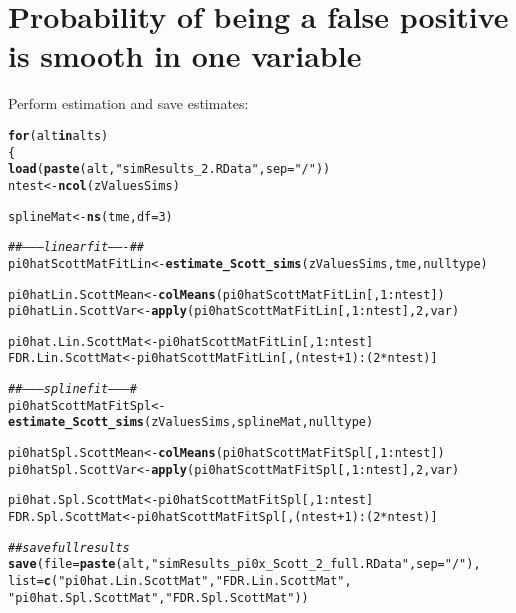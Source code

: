 \documentclass{article}\usepackage[]{graphicx}\usepackage[]{color}
\makeatletter
\newcommand{\hlnum}[1]{\textcolor[rgb]{0.686,0.059,0.569}{#1}}%
\newcommand{\hlstr}[1]{\textcolor[rgb]{0.192,0.494,0.8}{#1}}%
\newcommand{\hlcom}[1]{\textcolor[rgb]{0.678,0.584,0.686}{\textit{#1}}}%
\newcommand{\hlopt}[1]{\textcolor[rgb]{0,0,0}{#1}}%
\newcommand{\hlstd}[1]{\textcolor[rgb]{0.345,0.345,0.345}{#1}}%
\newcommand{\hlkwa}[1]{\textcolor[rgb]{0.161,0.373,0.58}{\textbf{#1}}}%
\newcommand{\hlkwb}[1]{\textcolor[rgb]{0.69,0.353,0.396}{#1}}%
\newcommand{\hlkwc}[1]{\textcolor[rgb]{0.333,0.667,0.333}{#1}}%
\newcommand{\hlkwd}[1]{\textcolor[rgb]{0.737,0.353,0.396}{\textbf{#1}}}%
\newenvironment{kframe}{%
 \def\at@end@of@kframe{}%
 \ifinner\ifhmode%
  \def\at@end@of@kframe{\end{minipage}}%
  \begin{minipage}{\columnwidth}%
 \fi\fi%
 \def\FrameCommand##1{\hskip\@totalleftmargin \hskip-\fboxsep
 \colorbox{shadecolor}{##1}\hskip-\fboxsep
     \hskip-\linewidth \hskip-\@totalleftmargin \hskip\columnwidth}%
 \MakeFramed {\advance\hsize-\width
   \@totalleftmargin\z@ \linewidth\hsize
   \@setminipage}}%
 {\par\unskip\endMakeFramed%
 \at@end@of@kframe}
\newenvironment{knitrout}{}{} %
\makeatother
\begin{document}
\section{Probability of being a false positive is smooth in one variable}

Perform estimation and save estimates:

\begin{knitrout}
\color{fgcolor}\begin{kframe}
\begin{alltt}
\hlkwa{for}\hlstd{(alt} \hlkwa{in} \hlstd{alts)}
\hlstd{\{}
  \hlkwd{load}\hlstd{(}\hlkwd{paste}\hlstd{(alt,}\hlstr{"simResults_2.RData"}\hlstd{,}\hlkwc{sep}\hlstd{=}\hlstr{"/"}\hlstd{))}
  \hlstd{ntest} \hlkwb{<-} \hlkwd{ncol}\hlstd{(zValuesSims)}

  \hlstd{splineMat} \hlkwb{<-} \hlkwd{ns}\hlstd{(tme,}\hlkwc{df}\hlstd{=}\hlnum{3}\hlstd{)}

  \hlcom{##--------linear fit-------##}
  \hlstd{pi0hatScottMatFitLin} \hlkwb{<-} \hlkwd{estimate_Scott_sims}\hlstd{(zValuesSims, tme, nulltype)}

  \hlstd{pi0hatLin.ScottMean} \hlkwb{<-} \hlkwd{colMeans}\hlstd{(pi0hatScottMatFitLin[,}\hlnum{1}\hlopt{:}\hlstd{ntest])}
  \hlstd{pi0hatLin.ScottVar} \hlkwb{<-} \hlkwd{apply}\hlstd{(pi0hatScottMatFitLin[,}\hlnum{1}\hlopt{:}\hlstd{ntest],}\hlnum{2}\hlstd{,var)}

  \hlstd{pi0hat.Lin.ScottMat} \hlkwb{<-} \hlstd{pi0hatScottMatFitLin[,}\hlnum{1}\hlopt{:}\hlstd{ntest]}
  \hlstd{FDR.Lin.ScottMat} \hlkwb{<-} \hlstd{pi0hatScottMatFitLin[,(ntest}\hlopt{+}\hlnum{1}\hlstd{)}\hlopt{:}\hlstd{(}\hlnum{2}\hlopt{*}\hlstd{ntest)]}

  \hlcom{##---------spline fit---------#}
  \hlstd{pi0hatScottMatFitSpl} \hlkwb{<-} \hlkwd{estimate_Scott_sims}\hlstd{(zValuesSims, splineMat, nulltype)}

  \hlstd{pi0hatSpl.ScottMean} \hlkwb{<-} \hlkwd{colMeans}\hlstd{(pi0hatScottMatFitSpl[,}\hlnum{1}\hlopt{:}\hlstd{ntest])}
  \hlstd{pi0hatSpl.ScottVar} \hlkwb{<-} \hlkwd{apply}\hlstd{(pi0hatScottMatFitSpl[,}\hlnum{1}\hlopt{:}\hlstd{ntest],}\hlnum{2}\hlstd{,var)}

  \hlstd{pi0hat.Spl.ScottMat} \hlkwb{<-} \hlstd{pi0hatScottMatFitSpl[,}\hlnum{1}\hlopt{:}\hlstd{ntest]}
  \hlstd{FDR.Spl.ScottMat} \hlkwb{<-} \hlstd{pi0hatScottMatFitSpl[,(ntest}\hlopt{+}\hlnum{1}\hlstd{)}\hlopt{:}\hlstd{(}\hlnum{2}\hlopt{*}\hlstd{ntest)]}

  \hlcom{##save full results}
  \hlkwd{save}\hlstd{(}\hlkwc{file}\hlstd{=}\hlkwd{paste}\hlstd{(alt,}\hlstr{"simResults_pi0x_Scott_2_full.RData"}\hlstd{,}\hlkwc{sep}\hlstd{=}\hlstr{"/"}\hlstd{),}
       \hlkwc{list}\hlstd{=}\hlkwd{c}\hlstd{(}\hlstr{"pi0hat.Lin.ScottMat"}\hlstd{,} \hlstr{"FDR.Lin.ScottMat"}\hlstd{,}
              \hlstr{"pi0hat.Spl.ScottMat"}\hlstd{,} \hlstr{"FDR.Spl.ScottMat"}\hlstd{))}


\end{alltt}
\end{kframe}
\end{knitrout}
\end{document}
